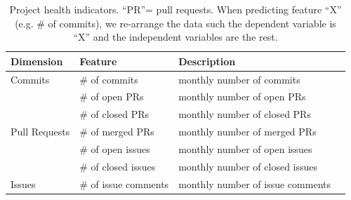 \documentclass[smallextended]{svjour3}
\newcommand{\cmark}{\ding{51}}%
\begin{document}
\begin{table}[!t]
\centering
\caption{Project health indicators.   ``PR''= pull requests.  When predicting feature ``X'' (e.g. \# of commits), we re-arrange the data such the dependent variable is ``X'' and the independent variables are the rest.
}
\label{tbl:feature}
\begin{adjustbox}{max width=0.98\textwidth}
\footnotesize
\begin{tabular}{lllc}
\rowcolor[HTML]{CCCCCC} 
{\color[HTML]{000000} Dimension} & {\color[HTML]{000000} Feature} & {\color[HTML]{000000} Description} & \multicolumn{1}{l}{\cellcolor[HTML]{CCCCCC}{\color[HTML]{000000} Predict?}} \\ \hline
{\color[HTML]{000000} Commits} & {\color[HTML]{000000} \# of commits} & {\color[HTML]{000000} monthly number of commits} & {\color[HTML]{000000} \cmark} \\ \hline
{\color[HTML]{000000} } & {\color[HTML]{000000} \# of open PRs} & {\color[HTML]{000000} monthly number of open PRs} & {\color[HTML]{000000} \cmark} \\
{\color[HTML]{000000} } & {\color[HTML]{000000} \# of closed PRs} & {\color[HTML]{000000} monthly number of closed PRs} & {\color[HTML]{000000} \cmark} \\
\multirow{-3}{*}{{\color[HTML]{000000} Pull Requests}} & {\color[HTML]{000000} \# of merged PRs} & {\color[HTML]{000000} monthly number of merged PRs} & {\color[HTML]{000000} } \\\hline
{\color[HTML]{000000} } & {\color[HTML]{000000} \# of open issues} & {\color[HTML]{000000} monthly number of open issues} & {\color[HTML]{000000} \cmark} \\
{\color[HTML]{000000} } & {\color[HTML]{000000} \# of closed issues} & {\color[HTML]{000000} monthly number of closed issues} & {\color[HTML]{000000} \cmark} \\
\multirow{-3}{*}{{\color[HTML]{000000} Issues}} & {\color[HTML]{000000} \# of issue comments} & {\color[HTML]{000000} monthly number of issue comments} & {\color[HTML]{000000} } \\ \hline

\end{tabular}
\end{adjustbox}
\end{table}
\end{document}
